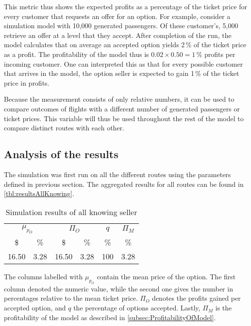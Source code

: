This metric thus shows the expected profits as a percentage of the ticket price for every customer that requests an offer for an option. For example, consider a simulation model with 10,000 generated passengers. Of these customer's, 5,000 retrieve an offer at a level that they accept. After completion of the run, the model calculates that on average an accepted option yields 2\,\% of the ticket price as a profit. The profitability of the model thus is $0.02 \times 0.50 = 1\,\%$ profits per incoming customer. One can interpreted this as that for every possible customer that arrives in the model, the option seller is expected to gain 1\,\% of the ticket price in profits.

Because the measurement consists of only relative numbers, it can be used to compare outcomes of flights with a different number of generated passengers or ticket prices. This variable will thus be used throughout the rest of the model to compare distinct routes with each other.


\subsection{Analysis of the results}
\label{subsec:AnalysisPerfectInformation}
The simulation was first run on all the different routes using the parameters defined in previous section. The aggregated results for all routes can be found in \autoref{tbl:resultsAllKnowing}.


\begin{table}
\begin{center}
\begin{tabular}{c c | c c | c | c }
\toprule
    \multicolumn{2}{c|}{$\mu_{p_O}$} & \multicolumn{2}{c|}{$\Pi_O$}  &  $q$  & $\Pi_M$ \\[.4ex]
    \$  & \%  &  \$  & \%  & \%  & \% \\
    \midrule
16.50  &    3.28  &   16.50   &    3.28  &   100  &   3.28 \\
    \bottomrule
\end{tabular}
\caption{Simulation results of all knowing seller}
\label{tbl:resultsAllKnowing}
\end{center}
\end{table}


The columns labelled with $\mu_{p_O}$ contain the mean price of the option. The first column denoted the numeric value, while the second one gives the number in percentages relative to the mean ticket price. $\Pi_O$ denotes the profits gained per accepted option, and $q$ the percentage of options accepted. Lastly, $\Pi_M$ is the profitability of the model as described in \autoref{subsec:ProfitabilityOfModel}.

